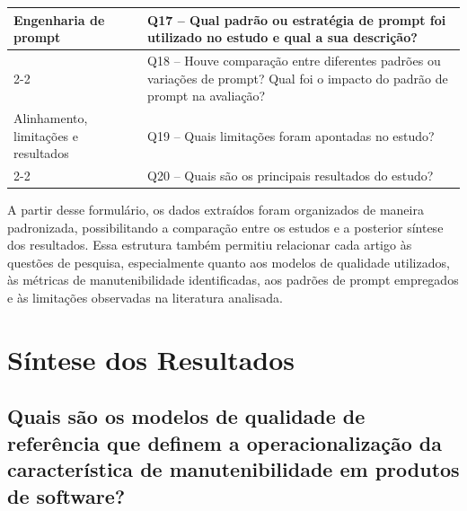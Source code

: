 \begin{longtable}{|p{3.5cm}|p{11cm}|}
Engenharia de prompt & Q17 -- Qual padrão ou estratégia de prompt foi utilizado no estudo e qual a sua descrição? \\ \cline{2-2}
 & Q18 -- Houve comparação entre diferentes padrões ou variações de prompt? Qual foi o impacto do padrão de prompt na avaliação? \\ \hline

Alinhamento, limitações e resultados & Q19 -- Quais limitações foram apontadas no estudo? \\ \cline{2-2}
 & Q20 -- Quais são os principais resultados do estudo? \\ \hline
\end{longtable}

A partir desse formulário, os dados extraídos foram organizados de maneira padronizada, possibilitando a comparação entre os estudos e a posterior síntese dos resultados. Essa estrutura também permitiu relacionar cada artigo às questões de pesquisa, especialmente quanto aos modelos de qualidade utilizados, às métricas de manutenibilidade identificadas, aos padrões de prompt empregados e às limitações observadas na literatura analisada.

\section{Síntese dos Resultados}

\subsection{Quais são os modelos de qualidade de referência que definem a operacionalização da característica de manutenibilidade em produtos de software?}




